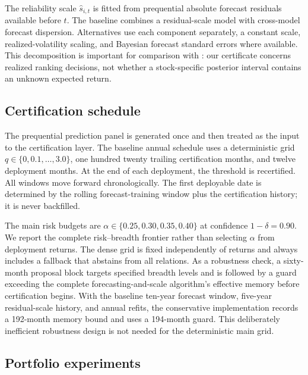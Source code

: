 The reliability scale $\widehat s_{i,t}$ is fitted from prequential absolute forecast residuals available before $t$. The baseline combines a residual-scale model with cross-model forecast dispersion. Alternatives use each component separately, a constant scale, realized-volatility scaling, and Bayesian forecast standard errors where available. This decomposition is important for comparison with \citet{Allena2026}: our certificate concerns realized ranking decisions, not whether a stock-specific posterior interval contains an unknown expected return.

\subsection{Certification schedule}

The prequential prediction panel is generated once and then treated as the input to the certification layer. The baseline annual schedule uses a deterministic grid $q\in\{0,0.1,\ldots,3.0\}$, one hundred twenty trailing certification months, and twelve deployment months. At the end of each deployment, the threshold is recertified. All windows move forward chronologically. The first deployable date is determined by the rolling forecast-training window plus the certification history; it is never backfilled.

The main risk budgets are $\alpha\in\{0.25,0.30,0.35,0.40\}$ at confidence $1-\delta=0.90$. We report the complete risk--breadth frontier rather than selecting $\alpha$ from deployment returns. The dense grid is fixed independently of returns and always includes a fallback that abstains from all relations. As a robustness check, a sixty-month proposal block targets specified breadth levels and is followed by a guard exceeding the complete forecasting-and-scale algorithm's effective memory before certification begins. With the baseline ten-year forecast window, five-year residual-scale history, and annual refits, the conservative implementation records a 192-month memory bound and uses a 194-month guard. This deliberately inefficient robustness design is not needed for the deterministic main grid.

\subsection{Portfolio experiments}

